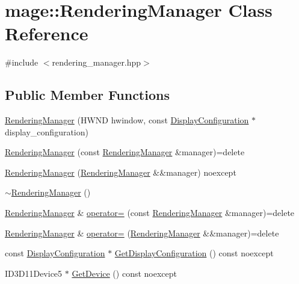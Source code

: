 \hypertarget{classmage_1_1_rendering_manager}{}\section{mage\+:\+:Rendering\+Manager Class Reference}
\label{classmage_1_1_rendering_manager}


{\ttfamily \#include $<$rendering\+\_\+manager.\+hpp$>$}

\subsection*{Public Member Functions}
\begin{DoxyCompactItemize}
\item 
\hyperlink{classmage_1_1_rendering_manager_aaff7375b93bf6019ff7aafb845b1a7a0}{Rendering\+Manager} (H\+W\+ND hwindow, const \hyperlink{structmage_1_1_display_configuration}{Display\+Configuration} $\ast$display\+\_\+configuration)
\item 
\hyperlink{classmage_1_1_rendering_manager_a897b5c41babd3ce622ea36d46191aca9}{Rendering\+Manager} (const \hyperlink{classmage_1_1_rendering_manager}{Rendering\+Manager} \&manager)=delete
\item 
\hyperlink{classmage_1_1_rendering_manager_a4e11d205eb43c4315c506c22b4e70254}{Rendering\+Manager} (\hyperlink{classmage_1_1_rendering_manager}{Rendering\+Manager} \&\&manager) noexcept
\item 
\hyperlink{classmage_1_1_rendering_manager_a4164e70f014de8d0348c35d5142cedab}{$\sim$\+Rendering\+Manager} ()
\item 
\hyperlink{classmage_1_1_rendering_manager}{Rendering\+Manager} \& \hyperlink{classmage_1_1_rendering_manager_a4c0455f5e40f1b1e16e10a133dffc87f}{operator=} (const \hyperlink{classmage_1_1_rendering_manager}{Rendering\+Manager} \&manager)=delete
\item 
\hyperlink{classmage_1_1_rendering_manager}{Rendering\+Manager} \& \hyperlink{classmage_1_1_rendering_manager_a765f323c63ac7cd53c71b362eaccc61b}{operator=} (\hyperlink{classmage_1_1_rendering_manager}{Rendering\+Manager} \&\&manager)=delete
\item 
const \hyperlink{structmage_1_1_display_configuration}{Display\+Configuration} $\ast$ \hyperlink{classmage_1_1_rendering_manager_a4d134773977675c902974bb3f914370e}{Get\+Display\+Configuration} () const noexcept
\item 
I\+D3\+D11\+Device5 $\ast$ \hyperlink{classmage_1_1_rendering_manager_a92dc62ffd2e86652edd86739ff878ac2}{Get\+Device} () const noexcept

\end{DoxyCompactItemize}
